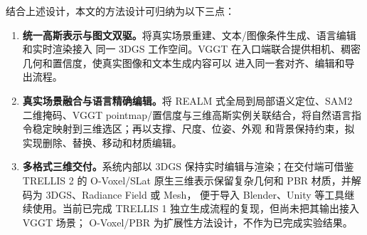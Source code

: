 结合上述设计，本文的方法设计可归纳为以下三点：
\begin{enumerate}[label=\arabic*.]
  \item \textbf{统一高斯表示与图文双驱。}将真实场景重建、文本/图像条件生成、语言编辑和实时渲染接入
  同一 3DGS 工作空间。VGGT 在入口端联合提供相机、稠密几何和置信度，使真实图像和文本生成内容可以
  进入同一套对齐、编辑和导出流程。
  \item \textbf{真实场景融合与语言精确编辑。}将 REALM 式全局到局部语义定位、SAM2 二维掩码、VGGT
  pointmap/置信度与三维高斯实例关联结合，将自然语言指令稳定映射到三维选区；再以支撑、尺度、位姿、外观
  和背景保持约束，拟实现删除、替换、移动和材质编辑。
  \item \textbf{多格式三维交付。}系统内部以 3DGS 保持实时编辑与渲染；在交付端可借鉴 TRELLIS 2
  的 O-Voxel/SLat 原生三维表示保留复杂几何和 PBR 材质，并解码为 3DGS、Radiance Field 或 Mesh，
  便于导入 Blender、Unity 等工具继续使用\cite{trellis,trellis2}。当前已完成 TRELLIS 1 独立生成流程的复现，但尚未把其输出接入 VGGT 场景；
  O-Voxel/PBR 为扩展性方法设计，不作为已完成实验结果。
\end{enumerate}
